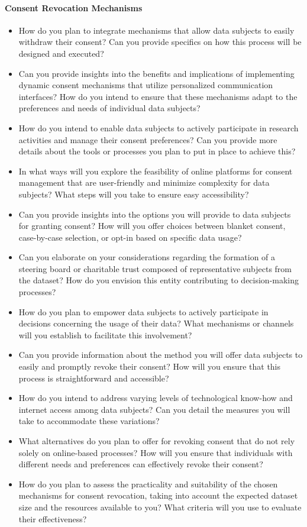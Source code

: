 \paragraph{Consent Revocation Mechanisms} 
\begin{itemize}
    \item How do you plan to integrate mechanisms that allow data subjects to easily
    withdraw their consent? Can you provide specifics on how this process will be
    designed and executed?
    \item Can you provide insights into the benefits and implications of implementing
    dynamic consent mechanisms that utilize personalized communication interfaces?
    How do you intend to ensure that these mechanisms adapt to the preferences and
    needs of individual data subjects?
    \item How do you intend to enable data subjects to actively participate in research
    activities and manage their consent preferences? Can you provide more details about
    the tools or processes you plan to put in place to achieve this?
    \item In what ways will you explore the feasibility of online platforms for consent
    management that are user-friendly and minimize complexity for data subjects? What
    steps will you take to ensure easy accessibility?
    \item Can you provide insights into the options you will provide to data subjects
    for granting consent? How will you offer choices between blanket consent,
    case-by-case selection, or opt-in based on specific data usage?
    \item Can you elaborate on your considerations regarding the formation of a
    steering board or charitable trust composed of representative subjects from the
    dataset? How do you envision this entity contributing to decision-making processes?
    \item How do you plan to empower data subjects to actively participate in decisions
    concerning the usage of their data? What mechanisms or channels will you establish
    to facilitate this involvement?
    \item Can you provide information about the method you will offer data subjects to
    easily and promptly revoke their consent? How will you ensure that this process is
    straightforward and accessible?
    \item How do you intend to address varying levels of technological know-how and
    internet access among data subjects? Can you detail the measures you will take to
    accommodate these variations?
    \item What alternatives do you plan to offer for revoking consent that do not rely
    solely on online-based processes? How will you ensure that individuals with
    different needs and preferences can effectively revoke their consent?
    \item How do you plan to assess the practicality and suitability of the chosen
    mechanisms for consent revocation, taking into account the expected dataset size
    and the resources available to you? What criteria will you use to evaluate their
    effectiveness?
\end{itemize}


